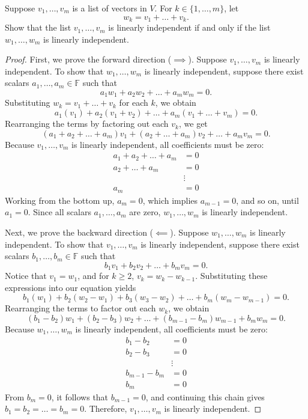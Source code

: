 \begin{question}
	Suppose $v_1, \dots, v_m$ is a list of vectors in $V$. For $k \in \{1, \dots, m\}$, let
	\[
	w_k = v_1 + \dots + v_k.
	\]
	Show that the list $v_1, \dots, v_m$ is linearly independent if and only if the list $w_1, \dots, w_m$ is linearly independent.
\end{question}
\begin{proof}
	First, we prove the forward direction ($\implies$). Suppose $v_1, \dots, v_m$ is linearly independent. To show that $w_1, \dots, w_m$ is linearly independent, suppose there exist scalars $a_1, \dots, a_m \in \mathbb{F}$ such that
	\[
	a_1 w_1 + a_2 w_2 + \dots + a_m w_m = 0.
	\]
	Substituting $w_k = v_1 + \dots + v_k$ for each $k$, we obtain
	\[
	a_1(v_1) + a_2(v_1 + v_2) + \dots + a_m(v_1 + \dots + v_m) = 0.
	\]
	Rearranging the terms by factoring out each $v_k$, we get
	\[
	(a_1 + a_2 + \dots + a_m)v_1 + (a_2 + \dots + a_m)v_2 + \dots + a_m v_m = 0.
	\]
	Because $v_1, \dots, v_m$ is linearly independent, all coefficients must be zero:
	\begin{align*}
		a_1 + a_2 + \dots + a_m &= 0 \\
		a_2 + \dots + a_m &= 0 \\
		&\vdots \\
		a_m &= 0
	\end{align*}
	Working from the bottom up, $a_m = 0$, which implies $a_{m-1} = 0$, and so on, until $a_1 = 0$. Since all scalars $a_1, \dots, a_m$ are zero, $w_1, \dots, w_m$ is linearly independent.
	
	Next, we prove the backward direction ($\impliedby$). Suppose $w_1, \dots, w_m$ is linearly independent. To show that $v_1, \dots, v_m$ is linearly independent, suppose there exist scalars $b_1, \dots, b_m \in \mathbb{F}$ such that
	\[
	b_1 v_1 + b_2 v_2 + \dots + b_m v_m = 0.
	\]
	Notice that $v_1 = w_1$, and for $k \ge 2$, $v_k = w_k - w_{k-1}$. Substituting these expressions into our equation yields
	\[
	b_1(w_1) + b_2(w_2 - w_1) + b_3(w_3 - w_2) + \dots + b_m(w_m - w_{m-1}) = 0.
	\]
	Rearranging the terms to factor out each $w_k$, we obtain
	\[
	(b_1 - b_2)w_1 + (b_2 - b_3)w_2 + \dots + (b_{m-1} - b_m)w_{m-1} + b_m w_m = 0.
	\]
	Because $w_1, \dots, w_m$ is linearly independent, all coefficients must be zero:
	\begin{align*}
		b_1 - b_2 &= 0 \\
		b_2 - b_3 &= 0 \\
		&\vdots \\
		b_{m-1} - b_m &= 0 \\
		b_m &= 0
	\end{align*}
	From $b_m = 0$, it follows that $b_{m-1} = 0$, and continuing this chain gives $b_1 = b_2 = \dots = b_m = 0$. Therefore, $v_1, \dots, v_m$ is linearly independent.
\end{proof}
